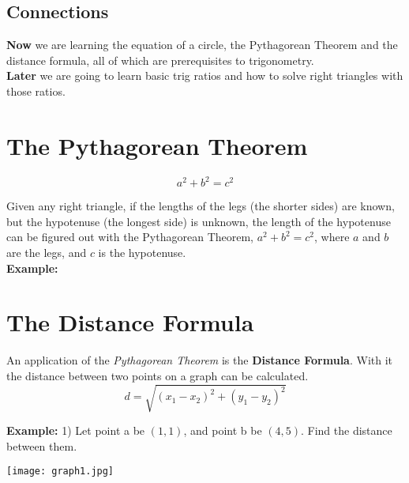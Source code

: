 \documentclass[12pt]{article}
\begin{document}
\subsection*{Connections}

\textbf{Now} we are learning the equation of a circle, the Pythagorean Theorem and the distance formula, all of which are prerequisites to trigonometry.\\

\textbf{Later} we are going to learn basic trig ratios and how to solve right triangles with those ratios.\\

\let\stdsection\section
\renewcommand\section{\newpage\stdsection}

\section*{The Pythagorean Theorem}

$$a^2+b^2=c^2$$

Given any right triangle, if the lengths of the legs (the shorter sides) are known, but the hypotenuse (the longest side) is unknown, the length of the hypotenuse can be figured out with the Pythagorean Theorem, $a^2+b^2=c^2$, where $a$ and $b$ are the legs, and $c$ is the hypotenuse.\\

\textbf{Example:} 

\pagebreak

\section*{The Distance Formula}

An application of the \textit{Pythagorean Theorem} is the \textbf{Distance Formula}. With it the distance between two points on a graph can be calculated.\\

$$d=\sqrt{(x_1-x_2)^{2}+(y_1-y_2)^{2}}$$

\textbf{Example:} 1) Let point a be $(1,1)$, and point b be $(4,5)$. Find the distance between them.\\

\begin{center}
\texttt{[image: graph1.jpg]}\\
\end{center}
\end{document}
